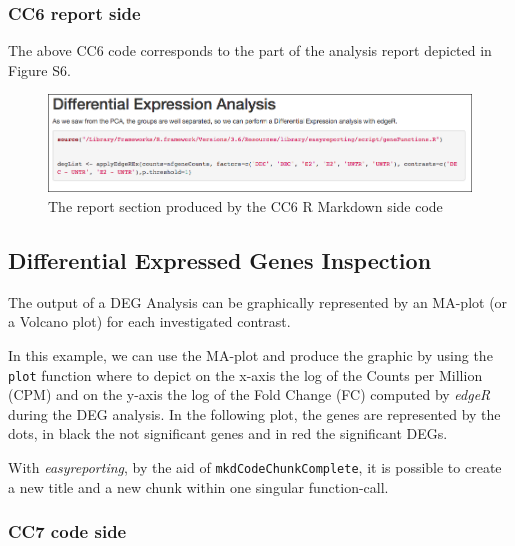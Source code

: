 \documentclass[]{article}
\begin{document}
\hypertarget{cc6-report-side}{%
\subsubsection{CC6 report side}\label{cc6-report-side}}

The above CC6 code corresponds to the part of the analysis report
depicted in Figure S6.

\begin{figure}[ht]

{\centering \includegraphics[width=0.95\linewidth]{imgs/6} 

}

\caption{The report section produced by the CC6 R Markdown side code}\label{fig:unnamed-chunk-14}
\end{figure}

\newpage

\hypertarget{differential-expressed-genes-inspection}{%
\subsection{Differential Expressed Genes
Inspection}\label{differential-expressed-genes-inspection}}

The output of a DEG Analysis can be graphically represented by an
MA-plot (or a Volcano plot) for each investigated contrast.

In this example, we can use the MA-plot and produce the graphic by using
the \texttt{plot} function where to depict on the x-axis the log of the
Counts per Million (CPM) and on the y-axis the log of the Fold Change
(FC) computed by \emph{edgeR} during the DEG analysis. In the following
plot, the genes are represented by the dots, in black the not
significant genes and in red the significant DEGs.

With \emph{easyreporting}, by the aid of \texttt{mkdCodeChunkComplete},
it is possible to create a new title and a new chunk within one singular
function-call.

\hypertarget{cc7-code-side}{%
\subsubsection{CC7 code side}\label{cc7-code-side}}
\end{document}

